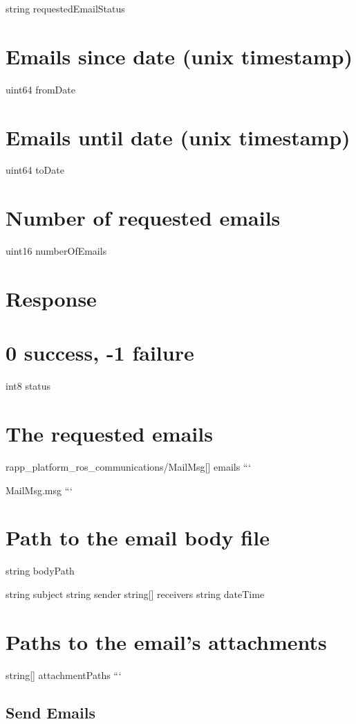 string requested\-Email\-Status

\section*{Emails since date (unix timestamp)}

uint64 from\-Date \section*{Emails until date (unix timestamp)}

uint64 to\-Date \section*{Number of requested emails}

uint16 number\-Of\-Emails 

 \section*{Response}

\section*{0 success, -\/1 failure}

int8 status

\section*{The requested emails}

rapp\-\_\-platform\-\_\-ros\-\_\-communications/\-Mail\-Msg\mbox{[}\mbox{]} emails ```

Mail\-Msg.\-msg ``` \section*{Path to the email body file}

string body\-Path

string subject string sender string\mbox{[}\mbox{]} receivers string date\-Time

\section*{Paths to the email's attachments}

string\mbox{[}\mbox{]} attachment\-Paths ```

\subsection*{Send Emails}

